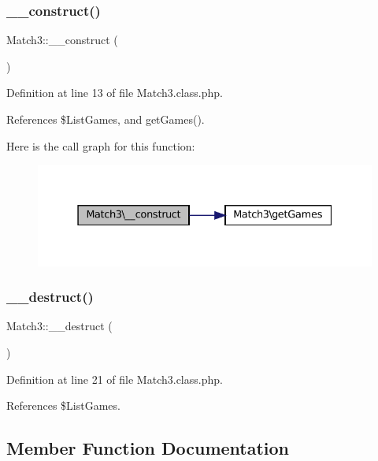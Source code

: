 \subsubsection{\texorpdfstring{\+\_\+\+\_\+construct()}{\_\_construct()}}
{\footnotesize\ttfamily Match3\+::\+\_\+\+\_\+construct (\begin{DoxyParamCaption}{ }\end{DoxyParamCaption})}



Definition at line 13 of file Match3.\+class.\+php.



References \$\+List\+Games, and get\+Games().

Here is the call graph for this function\+:\nopagebreak
\begin{figure}[H]
\begin{center}
\leavevmode
\includegraphics[width=331pt]{class_match3_ab34dd7d72e1050a177bb0bbbcc285874_cgraph}
\end{center}
\end{figure}
\mbox{\label{class_match3_aa5ebf7b6edc24f6f7568d30c5f170cab}} 
\subsubsection{\texorpdfstring{\+\_\+\+\_\+destruct()}{\_\_destruct()}}
{\footnotesize\ttfamily Match3\+::\+\_\+\+\_\+destruct (\begin{DoxyParamCaption}{ }\end{DoxyParamCaption})}



Definition at line 21 of file Match3.\+class.\+php.



References \$\+List\+Games.



\subsection{Member Function Documentation}
\mbox{\label{class_match3_a4aca8a2d842e41c176c3706347d6810b}} 
